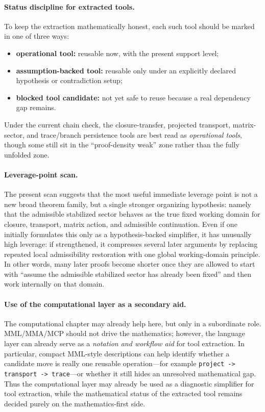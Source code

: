 \paragraph{Status discipline for extracted tools.}
To keep the extraction mathematically honest, each such tool should be marked in one of three ways:
\begin{itemize}[leftmargin=2em]
  \item \textbf{operational tool:} reusable now, with the present support level;
  \item \textbf{assumption-backed tool:} reusable only under an explicitly declared hypothesis or contradiction setup;
  \item \textbf{blocked tool candidate:} not yet safe to reuse because a real dependency gap remains.
\end{itemize}
Under the current chain check, the closure-transfer, projected transport, matrix-sector, and trace/branch persistence tools are best read as \emph{operational tools}, though some still sit in the ``proof-density weak'' zone rather than the fully unfolded zone.

\paragraph{Leverage-point scan.}
The present scan suggests that the most useful immediate leverage point is not a new broad theorem family, but a single stronger organizing hypothesis: namely that the admissible stabilized sector behaves as the true fixed working domain for closure, transport, matrix action, and admissible continuation. Even if one initially formulates this only as a hypothesis-backed simplifier, it has unusually high leverage: if strengthened, it compresses several later arguments by replacing repeated local admissibility restoration with one global working-domain principle. In other words, many later proofs become shorter once they are allowed to start with ``assume the admissible stabilized sector has already been fixed'' and then work internally on that domain.

\paragraph{Use of the computational layer as a secondary aid.}
The computational chapter may already help here, but only in a subordinate role. MML/MMA/MCP should not drive the mathematics; however, the language layer can already serve as a \emph{notation and workflow aid} for tool extraction. In particular, compact MML-style descriptions can help identify whether a candidate move is really one reusable operation---for example \texttt{project -> transport -> trace}---or whether it still hides an unresolved mathematical gap. Thus the computational layer may already be used as a diagnostic simplifier for tool extraction, while the mathematical status of the extracted tool remains decided purely on the mathematics-first side.

